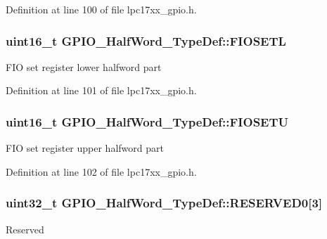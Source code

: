 \-Definition at line 100 of file lpc17xx\-\_\-gpio.\-h.

\hypertarget{struct_g_p_i_o___half_word___type_def_a7e7bfa7e83f7be6f17214e5b960a4102}{
\subsubsection[{\-F\-I\-O\-S\-E\-T\-L}]{ uint16\-\_\-t {\bf \-G\-P\-I\-O\-\_\-\-Half\-Word\-\_\-\-Type\-Def\-::\-F\-I\-O\-S\-E\-T\-L}}}\label{struct_g_p_i_o___half_word___type_def_a7e7bfa7e83f7be6f17214e5b960a4102}
\-F\-I\-O set register lower halfword part 

\-Definition at line 101 of file lpc17xx\-\_\-gpio.\-h.

\hypertarget{struct_g_p_i_o___half_word___type_def_a5cc003e464ca06aae2378c85574d347f}{
\subsubsection[{\-F\-I\-O\-S\-E\-T\-U}]{ uint16\-\_\-t {\bf \-G\-P\-I\-O\-\_\-\-Half\-Word\-\_\-\-Type\-Def\-::\-F\-I\-O\-S\-E\-T\-U}}}\label{struct_g_p_i_o___half_word___type_def_a5cc003e464ca06aae2378c85574d347f}
\-F\-I\-O set register upper halfword part 

\-Definition at line 102 of file lpc17xx\-\_\-gpio.\-h.

\hypertarget{struct_g_p_i_o___half_word___type_def_aee0146250c1ae227bb566ee6f4435f62}{
\subsubsection[{\-R\-E\-S\-E\-R\-V\-E\-D0}]{\setlength{\rightskip}{0pt plus 5cm}uint32\-\_\-t {\bf \-G\-P\-I\-O\-\_\-\-Half\-Word\-\_\-\-Type\-Def\-::\-R\-E\-S\-E\-R\-V\-E\-D0}\mbox{[}3\mbox{]}}}\label{struct_g_p_i_o___half_word___type_def_aee0146250c1ae227bb566ee6f4435f62}
\-Reserved 

